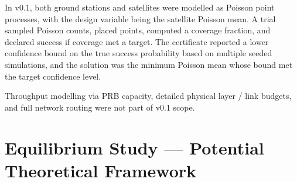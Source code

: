 \documentclass[11pt,a4paper]{article}
\begin{document}
In v0.1, both ground stations and satellites were modelled as Poisson point processes, with the design variable being
the satellite Poisson mean. A trial sampled Poisson counts, placed points, computed a coverage fraction, and
declared success if coverage met a target. The certificate reported a lower confidence bound on the true success
probability based on multiple seeded simulations, and the solution was the minimum Poisson mean whose bound met the target confidence level.

Throughput modelling via PRB capacity, detailed physical layer / link budgets, and full network routing were not part of v0.1 scope.

\section{Equilibrium Study --- Potential Theoretical Framework}
\begingroup
\let\StudySubsection\subsection
\let\StudySubsubsection\subsubsection
\let\StudyParagraph\paragraph
\renewcommand{\section}{\StudySubsection}
\renewcommand{\subsection}{\StudySubsubsection}
\renewcommand{\subsubsection}{\StudyParagraph}

\endgroup
\end{document}
